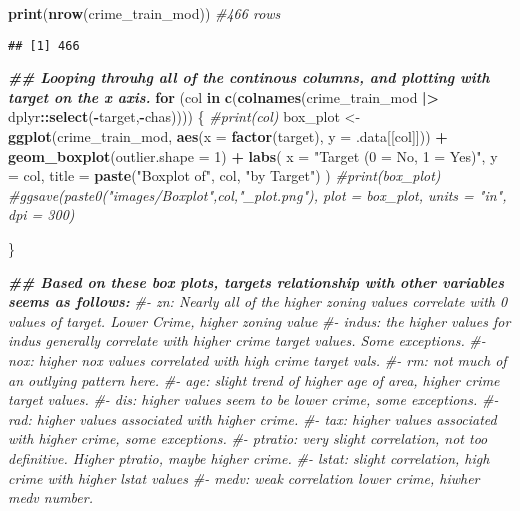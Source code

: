 \documentclass[
]{article}
\newenvironment{Shaded}{\begin{snugshade}}{\end{snugshade}}
\newcommand{\AttributeTok}[1]{\textcolor[rgb]{0.13,0.29,0.53}{#1}}
\newcommand{\CommentTok}[1]{\textcolor[rgb]{0.56,0.35,0.01}{\textit{#1}}}
\newcommand{\ControlFlowTok}[1]{\textcolor[rgb]{0.13,0.29,0.53}{\textbf{#1}}}
\newcommand{\DecValTok}[1]{\textcolor[rgb]{0.00,0.00,0.81}{#1}}
\newcommand{\DocumentationTok}[1]{\textcolor[rgb]{0.56,0.35,0.01}{\textbf{\textit{#1}}}}
\newcommand{\FunctionTok}[1]{\textcolor[rgb]{0.13,0.29,0.53}{\textbf{#1}}}
\newcommand{\NormalTok}[1]{#1}
\newcommand{\OtherTok}[1]{\textcolor[rgb]{0.56,0.35,0.01}{#1}}
\newcommand{\SpecialCharTok}[1]{\textcolor[rgb]{0.81,0.36,0.00}{\textbf{#1}}}
\newcommand{\StringTok}[1]{\textcolor[rgb]{0.31,0.60,0.02}{#1}}
\begin{document}
\begin{Shaded}
\begin{Highlighting}[]
\FunctionTok{print}\NormalTok{(}\FunctionTok{nrow}\NormalTok{(crime\_train\_mod)) }\CommentTok{\#466 rows}
\end{Highlighting}
\end{Shaded}

\begin{verbatim}
## [1] 466
\end{verbatim}

\begin{Shaded}
\begin{Highlighting}[]
\DocumentationTok{\#\# Looping throuhg all of the continous columns, and plotting with target on the x axis. }
\ControlFlowTok{for}\NormalTok{ (col }\ControlFlowTok{in} \FunctionTok{c}\NormalTok{(}\FunctionTok{colnames}\NormalTok{(crime\_train\_mod }\SpecialCharTok{|\textgreater{}}\NormalTok{ dplyr}\SpecialCharTok{::}\FunctionTok{select}\NormalTok{(}\SpecialCharTok{{-}}\NormalTok{target,}\SpecialCharTok{{-}}\NormalTok{chas)))) \{}
  \CommentTok{\#print(col)}
\NormalTok{  box\_plot }\OtherTok{\textless{}{-}} \FunctionTok{ggplot}\NormalTok{(crime\_train\_mod, }\FunctionTok{aes}\NormalTok{(}\AttributeTok{x =} \FunctionTok{factor}\NormalTok{(target), }\AttributeTok{y =}\NormalTok{ .data[[col]])) }\SpecialCharTok{+}
    \FunctionTok{geom\_boxplot}\NormalTok{(}\AttributeTok{outlier.shape =} \DecValTok{1}\NormalTok{) }\SpecialCharTok{+}
    \FunctionTok{labs}\NormalTok{(}
      \AttributeTok{x =} \StringTok{"Target (0 = No, 1 = Yes)"}\NormalTok{,}
      \AttributeTok{y =}\NormalTok{ col,}
      \AttributeTok{title =} \FunctionTok{paste}\NormalTok{(}\StringTok{"Boxplot of"}\NormalTok{, col, }\StringTok{"by Target"}\NormalTok{)}
\NormalTok{    )}
  \CommentTok{\#print(box\_plot)}
  \CommentTok{\#ggsave(paste0("images/Boxplot",col,"\_plot.png"), plot = box\_plot, units = "in", dpi = 300)}

\NormalTok{\}}

\DocumentationTok{\#\# Based on these box plots, target\textquotesingle{}s relationship with other variables seems as follows: }
\CommentTok{\#{-} zn: Nearly all of the higher zoning values correlate with 0 values of target. Lower Crime, higher zoning value}
\CommentTok{\#{-} indus: the higher values for indus generally correlate with higher crime target values. Some exceptions.}
\CommentTok{\#{-} nox: higher nox values correlated with high crime target vals. }
\CommentTok{\#{-} rm: not much of an outlying pattern here.}
\CommentTok{\#{-} age: slight trend of higher age of area, higher crime target values.}
\CommentTok{\#{-} dis: higher values seem to be lower crime, some exceptions.}
\CommentTok{\#{-} rad: higher values associated with higher crime.}
\CommentTok{\#{-} tax: higher values associated with higher crime, some exceptions.}
\CommentTok{\#{-} ptratio: very slight correlation, not too definitive. Higher ptratio, maybe higher crime.}
\CommentTok{\#{-} lstat: slight correlation, high crime with higher lstat values}
\CommentTok{\#{-} medv: weak correlation lower crime, hiwher medv number. }
\end{Highlighting}
\end{Shaded}
\end{document}
